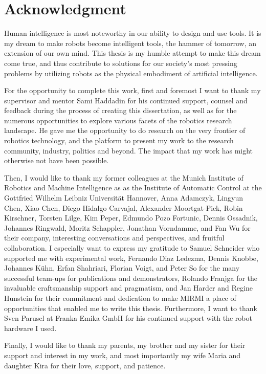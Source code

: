\cleardoublepage{}
\chapter*{Acknowledgment}

Human intelligence is most noteworthy in our ability to design and use tools.
It is my dream to make robots become intelligent tools, the hammer of tomorrow, an extension of our own mind.
This thesis is my humble attempt to make this dream come true, and thus contribute to solutions for our society's most pressing problems by utilizing robots as the physical embodiment of artificial intelligence.

For the opportunity to complete this work, first and foremost I want to thank my supervisor and mentor Sami Haddadin for his continued support, counsel and feedback during the process of creating this dissertation, as well as for the numerous opportunities to explore various facets of the robotics research landscape.
He gave me the opportunity to do research on the very frontier of robotics technology, and the platform to present my work to the research community, industry, politics and beyond.
The impact that my work has might otherwise not have been possible.

Then, I would like to thank my former colleagues at the Munich Institute of Robotics and Machine Intelligence as as the Institute of Automatic Control at the Gottfried Wilhelm Leibniz Universit\"at Hannover, Anna Adamczyk, Lingyun Chen, Xiao Chen, Diego Hidalgo Carvajal, Alexander Moortgat-Pick, Robin Kirschner, Torsten Lilge, Kim Peper, Edmundo Pozo Fortunic, Dennis Ossadnik, Johannes Ringwald, Moritz Schappler, Jonathan Vorndamme, and Fan Wu for their company, interesting conversations and perspectives, and fruitful collaboration.
I especially want to express my gratitude to Samuel Schneider who supported me with experimental work, Fernando Diaz Ledezma, Dennis Knobbe, Johannes K\"uhn, Erfan Shahriari, Florian Voigt, and Peter So for the many successful team-ups for publications and demonstrators, Rolando Franjga for the invaluable craftsmanship support and pragmatism, and Jan Harder and Regine Hunstein for their commitment and dedication to make MIRMI a place of opportunities that enabled me to write this thesis.
Furthermore, I want to thank Sven Parusel at Franka Emika GmbH for his continued support with the robot hardware I used.

Finally, I would like to thank my parents, my brother and my sister for their support and interest in my work, and most importantly my wife Maria and daughter Kira for their love, support, and patience.